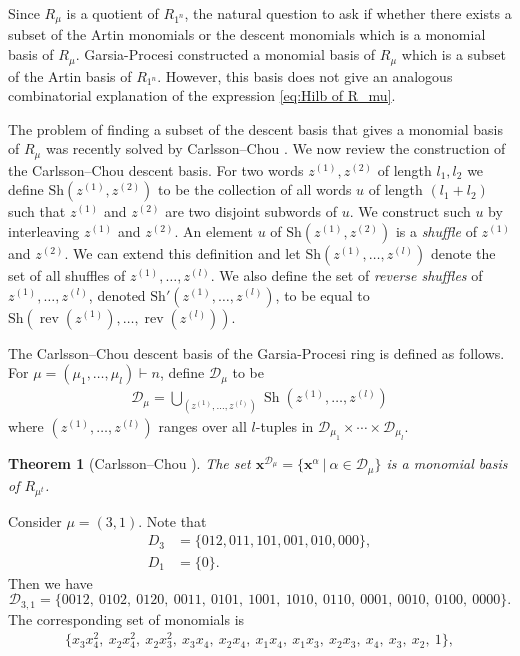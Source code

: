 \documentclass[10pt]{amsart}
\theoremstyle{plain}
\theoremstyle{definition}
\theoremstyle{plain}
\theoremstyle{plain}
\theoremstyle{remark}
\theoremstyle{plain}
\newtheorem{thm}[thm]{Theorem}
\theoremstyle{plain}
\DeclareMathOperator{\sh}{Sh}
\DeclareMathOperator{\rev}{rev}
\begin{document}
Since $R_\mu$  is a quotient of $R_{1^n}$, the natural question to ask if whether there exists a subset of the Artin monomials or the descent monomials which is a monomial basis of $R_\mu$.
Garsia-Procesi \cite{GP} constructed a monomial basis of $R_\mu$  which is a subset of the Artin basis of $R_{1^n}$. However, this basis does not give an analogous combinatorial explanation of the expression \eqref{eq:Hilb of R_mu}.

The problem of finding a subset of the descent basis that gives a monomial basis of $R_\mu$ was recently solved by Carlsson--Chou \cite{CC}.
We now review the construction of the Carlsson--Chou descent basis. 
For two words $z^{(1)},z^{(2)}$ of length $l_1, l_2$ we define $\text{Sh}(z^{(1)},z^{(2)})$ to be the collection of all words $u$ of length $(l_1+l_2)$ such that $z^{(1)}$ and $z^{(2)}$ are two disjoint subwords of $u$.
We construct such $u$ by interleaving $z^{(1)}$ and  $z^{(2)}$. An element $u$ of $\text{Sh}( z^{(1)},z^{(2)})$ is a \textit{shuffle} of $z^{(1)}$ and $z^{(2)}$. We can extend this definition and let $\text{Sh}(z^{(1)},\dots , z^{(l)})$ denote the set of all shuffles of $z^{(1)},\dots , z^{(l)}$.
We also define the set of \textit{reverse shuffles}  of  $z^{(1)},\dots , z^{(l)}$, denoted $\text{Sh}'(z^{(1)},\dots , z^{(l)})$, to be equal to $\text{Sh}(\rev (z^{(1)}),\dots , \rev(z^{(l)}))$.

The Carlsson--Chou descent basis of the Garsia-Procesi ring is defined as follows. 
For $\mu = (\mu_1,\dots,\mu_l) \vdash n$, define $\mathcal{D}_\mu$ to be
\begin{align}
    \mathcal{D}_\mu = \bigcup_{(z^{(1)},\dots , z^{(l)})} \sh (z^{(1)},\dots , z^{(l)})
\end{align}
where $(z^{(1)},\dots , z^{(l)})$ ranges over all $l$-tuples in $\mathcal{D}_{\mu_1}\times \cdots \times \mathcal{D}_{\mu_l}$.

\begin{thm}[Carlsson--Chou \cite{CC}]
The set $\mathbf{x}^{\mathcal{D}_\mu} = \{\mathbf{x}^\alpha \ | \ \alpha \in  \mathcal{D}_\mu\}$  is a monomial basis of $R_{\mu^t}$. 
\end{thm}   

\begin{ex}\label{ex: 31}
    Consider $\mu = (3,1).$ Note that 
    \begin{align*}
        D_3 &= \{012,011, 101, 001,010, 000\},\\
        D_1 &= \{0\}.
    \end{align*}
  Then we have 
  \[\mathcal{D}_{3,1}  = \{0012,\ 0102,\ 0120, \ 0011, \ 0101, \ 1001, \ 1010, \ 0110,\  0001,\ 0010,\ 0100, \ 0000\} .\]
  The corresponding set of monomials is  
  \begin{align*}
       \{x_3x_4^2,
  \ x_2x_4^2, \ x_2x_3^2, \ x_3x_4 ,\  x_2x_4, \ x_1x_4, \ x_1x_3, \ x_2x_3, \ x_4, \ x_3 , \ x_2, \ 1\},
  \end{align*}
\end{ex}
\end{document}
